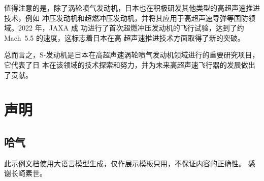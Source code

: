 \documentclass{pkuthesis}
\begin{document}
值得注意的是，除了涡轮喷气发动机，日本也在积极研发其他类型的高超声速推进技术，例如
冲压发动机和超燃冲压发动机，并将其应用于高超声速导弹等国防领域。2022 年，JAXA 成
功进行了首次超燃冲压发动机的飞行试验，达到了约 Mach~5.5 的速度，这标志着日本在高
超声速推进技术方面取得了新的突破。

总而言之，S-发动机是日本在高超声速涡轮喷气发动机领域进行的重要研究项目，它代表了日
本在该领域的技术探索和努力，并为未来高超声速飞行器的发展做出了贡献。
\printbibliography
\appendix
\section{声明}
\subsection{哈气}
此示例文档使用大语言模型生成，仅作展示模板只用，不保证内容的正确性。
\acknowledgments
感谢长崎素世。
\end{document}
